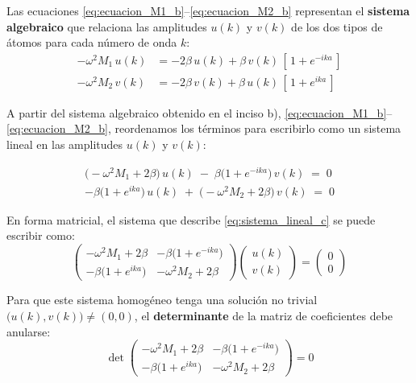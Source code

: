 \documentclass{article}
\begin{document}
\vspace{0.4cm}
Las ecuaciones \eqref{eq:ecuacion_M1_b}–\eqref{eq:ecuacion_M2_b} representan el \textbf{sistema algebraico} que relaciona las amplitudes \(u(k)\) y \(v(k)\) de los dos tipos de átomos para cada número de onda \(k\):
\[
\boxed{
\begin{aligned}
-\omega^{2}M_{1}\,u(k) &= -2\beta\,u(k)+\beta\,v(k)\,[\,1+e^{-ika}\,]\\
-\omega^{2}M_{2}\,v(k) &= -2\beta\,v(k)+\beta\,u(k)\,[\,1+e^{ika}\,]
\end{aligned}
}
\]


\;

A partir del sistema algebraico obtenido en el inciso b), \eqref{eq:ecuacion_M1_b}–\eqref{eq:ecuacion_M2_b}, reordenamos
los términos para escribirlo como un sistema lineal en las amplitudes \(u(k)\) y \(v(k)\):

\begin{equation}
\begin{split}
\big(-\omega^{2}M_{1}+2\beta\big)\,u(k)\;-\;\beta\big(1+e^{-ika}\big)\,v(k) \;=\; 0\\
-\beta\big(1+e^{ika}\big)\,u(k)\;+\;\big(-\omega^{2}M_{2}+2\beta\big)\,v(k) \;=\; 0
\end{split}
\label{eq:sistema_lineal_c}
\end{equation}

En forma matricial, el sistema que describe \eqref{eq:sistema_lineal_c} se puede escribir como:
\begin{equation}
\begin{pmatrix}
-\omega^{2}M_{1}+2\beta & -\beta\big(1+e^{-ika}\big)\\[4pt]
-\beta\big(1+e^{ika}\big) & -\omega^{2}M_{2}+2\beta
\end{pmatrix}
\begin{pmatrix}
u(k)\\[2pt] v(k)
\end{pmatrix}
=
\begin{pmatrix}
0\\[2pt] 0
\end{pmatrix}
\label{eq:matriz_cruda_c}
\end{equation}

Para que este sistema homogéneo tenga una solución no trivial \(\big(u(k),v(k)\big)\neq(0,0)\),
el \textbf{determinante} de la matriz de coeficientes debe anularse:
\begin{equation}
\det
\begin{pmatrix}
-\omega^{2}M_{1}+2\beta & -\beta\big(1+e^{-ika}\big)\\[4pt]
-\beta\big(1+e^{ika}\big) & -\omega^{2}M_{2}+2\beta
\end{pmatrix}
=0
\label{eq:cond_no_trivialidad}
\end{equation}
\end{document}
